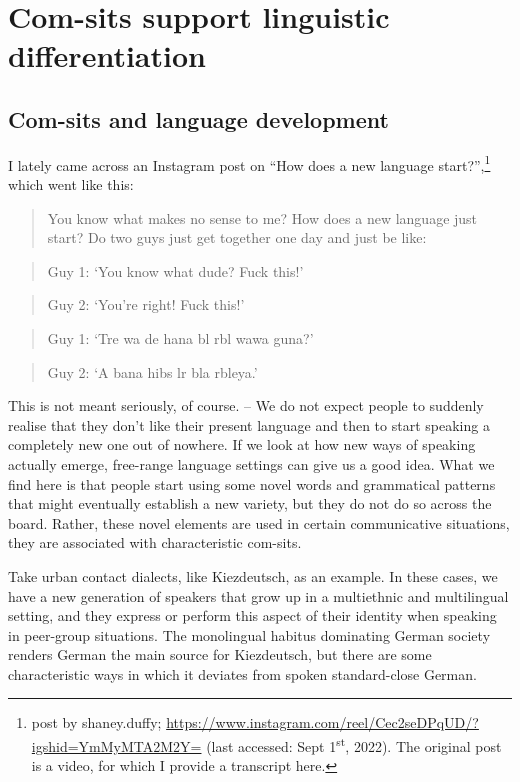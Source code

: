 \chapter{Com-sits support linguistic differentiation}\label{chap:3}
\label{bkm:Ref121466446}\hypertarget{Toc125444657}{}\section{Com-sits and language development}
\label{bkm:Ref115420422}\hypertarget{Toc125444658}{}
I lately came across an Instagram post on “How does a new language start?”,\footnote{post by shaney.duffy; \url{https://www.instagram.com/reel/Cec2seDPqUD/?igshid=YmMyMTA2M2Y=} (last accessed: Sept 1\textsuperscript{st}, 2022). The original post is a video, for which I provide a transcript here.} which went like this:

\begin{quote}
You know what makes no sense to me? How does a new language just start? Do two guys just get together one day and just be like:
\end{quote}

\begin{quote}
Guy 1: ‘You know what dude? Fuck this!’
\end{quote}

\begin{quote}
Guy 2: ‘You’re right! Fuck this!’
\end{quote}

\begin{quote}
Guy 1: ‘Tre wa de hana bl rbl wawa guna?’
\end{quote}

\begin{quote}
Guy 2: ‘A bana hibs lr bla rbleya.’
\end{quote}

This is not meant seriously, of course. – We do not expect people to suddenly realise that they don’t like their present language and then to start speaking a completely new one out of nowhere. If we look at how new ways of speaking actually emerge, free-range language settings can give us a good idea. What we find here is that people start using some novel words and grammatical patterns that might eventually establish a new variety, but they do not do so across the board. Rather, these novel elements are used in certain communicative situations, they are associated with characteristic com-sits.

Take urban contact dialects, like Kiezdeutsch, as an example. In these cases, we have a new generation of speakers that grow up in a multiethnic and multilingual setting, and they express or perform this aspect of their identity when speaking in peer-group situations. The monolingual habitus dominating German society renders German the main source for Kiezdeutsch, but there are some characteristic ways in which it deviates from spoken standard-close German.

